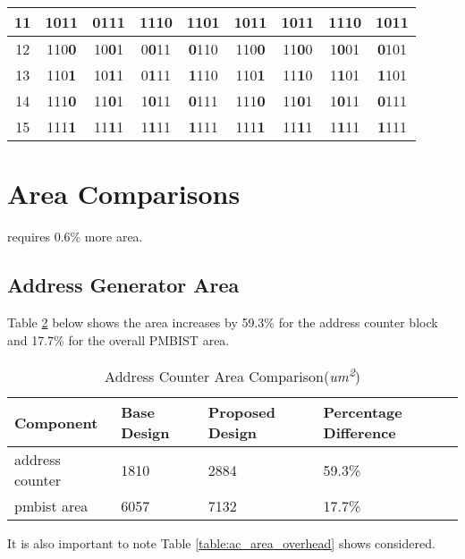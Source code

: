 \begin{table}[H]
\begin{tabular}{|c||c|c|c|c||c|c|c|c|}
  11 & 101\textbf{1} & 01\textbf{1}1 & 1\textbf{1}10 & \textbf{1}101 & 101\textbf{1} & 10\textbf{1}1 & 1\textbf{1}10 & \textbf{1}011 \\  
  \hline                                                                           
  12 & 110\textbf{0} & 10\textbf{0}1 & 0\textbf{0}11 & \textbf{0}110 & 110\textbf{0} & 11\textbf{0}0 & 1\textbf{0}01 & \textbf{0}101 \\  
  13 & 110\textbf{1} & 10\textbf{1}1 & 0\textbf{1}11 & \textbf{1}110 & 110\textbf{1} & 11\textbf{1}0 & 1\textbf{1}01 & \textbf{1}101 \\  
  14 & 111\textbf{0} & 11\textbf{0}1 & 1\textbf{0}11 & \textbf{0}111 & 111\textbf{0} & 11\textbf{0}1 & 1\textbf{0}11 & \textbf{0}111 \\  
  15 & 111\textbf{1} & 11\textbf{1}1 & 1\textbf{1}11 & \textbf{1}111 & 111\textbf{1} & 11\textbf{1}1 & 1\textbf{1}11 & \textbf{1}111 \\  
  \hline
  \end{tabular}
  \label{tab:2i}
\end{table}

\section{Area Comparisons}
requires 0.6\% more area.

\label{sect:cln-area}
\subsection{Address Generator Area}
Table \ref{table:ac_area_compare} below shows the area increases by  59.3\% for the address counter block and 17.7\% for the overall PMBIST area.  

\begin{table}[H]
\caption[Address Counter Area Comparison]{Address Counter Area Comparison(\textit{um\textsuperscript{2}})}
\centering
\begin{tabular}{| l | l | l | l |}
\hline
Component & Base Design & Proposed Design & Percentage Difference \\ [0.5ex]
\hline\hline
address counter & 1810   & 2884   & 59.3\% \\
pmbist area     & 6057   & 7132   & 17.7\% \\ 
\hline
\end{tabular}
\label{table:ac_area_compare}
\end{table}

It is also important to note Table \ref{table:ac_area_overhead} shows considered.   

